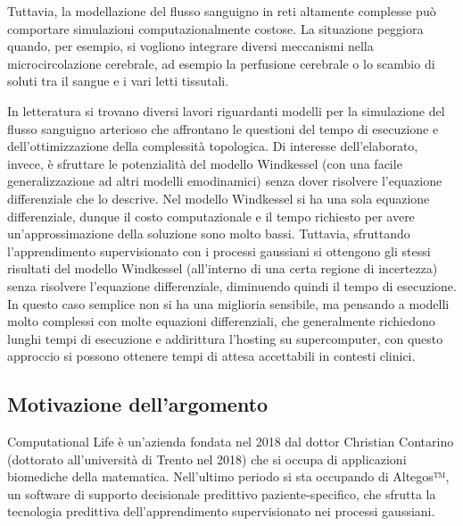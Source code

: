 Tuttavia, la modellazione del flusso sanguigno in reti altamente complesse può comportare simulazioni computazionalmente costose. 
La situazione peggiora quando, per esempio, si vogliono integrare diversi meccanismi nella microcircolazione cerebrale, ad esempio la perfusione cerebrale o lo scambio di soluti tra il sangue e i vari letti tissutali.

In letteratura si trovano diversi lavori riguardanti modelli per la simulazione del flusso sanguigno arterioso che affrontano le questioni del tempo di esecuzione e dell'ottimizzazione della complessità topologica. Di interesse dell'elaborato, invece, è sfruttare le potenzialità del modello Windkessel (con una facile generalizzazione ad altri modelli emodinamici) senza dover risolvere l'equazione differenziale che lo descrive. Nel modello Windkessel si ha una sola equazione differenziale, dunque il costo computazionale e il tempo richiesto per avere un'approssimazione della soluzione sono molto bassi. Tuttavia, sfruttando l'apprendimento supervisionato con i processi gaussiani si ottengono gli stessi risultati del modello Windkessel (all'interno di una certa regione di incertezza) senza risolvere l'equazione differenziale, diminuendo quindi il tempo di esecuzione. In questo caso semplice non si ha una miglioria sensibile, ma pensando a modelli molto complessi con molte equazioni differenziali, che generalmente richiedono lunghi tempi di esecuzione e addirittura l'hosting su supercomputer, con questo approccio si possono ottenere tempi di attesa accettabili in contesti clinici.

\newpage

\subsection{Motivazione dell'argomento}
Computational Life è un'azienda fondata nel 2018 dal dottor Christian Contarino (dottorato all'università di Trento nel 2018) che si occupa di applicazioni biomediche della matematica. Nell'ultimo periodo si sta occupando di Altegos™, un software di supporto decisionale predittivo paziente-specifico, che sfrutta la tecnologia predittiva dell'apprendimento supervisionato nei processi gaussiani. 

